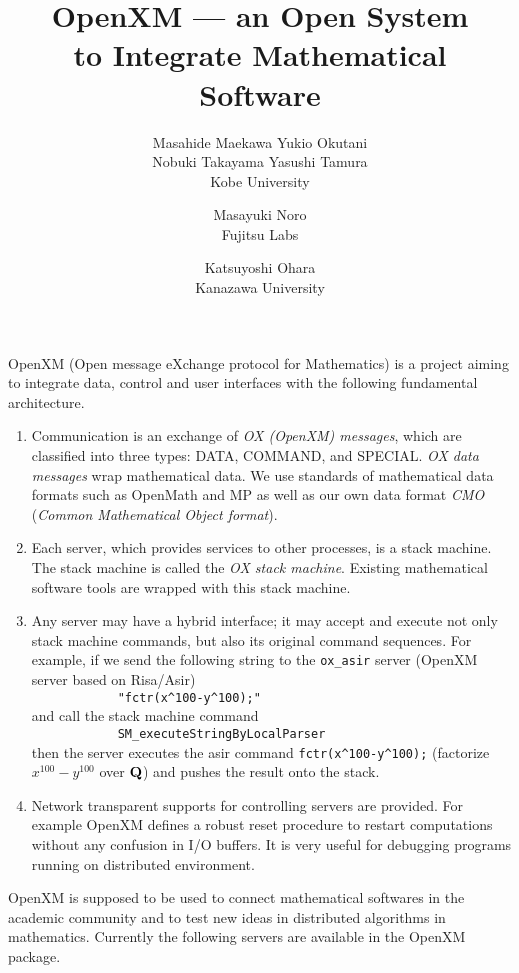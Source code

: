 \documentclass[notitlepage]{book}
\begin{document}
\date{}
\title{OpenXM 
      --- an Open System \\ to Integrate Mathematical Software}
\author{
{\hfil}
\and
{Masahide Maekawa \quad Yukio Okutani}\\
{Nobuki Takayama \quad Yasushi Tamura}\\
Kobe University
\and
{\hfil}
\and
{Masayuki Noro}\\
{Fujitsu Labs}
\and
{Katsuyoshi Ohara}\\
{Kanazawa University}
}
\maketitle

OpenXM (Open message eXchange protocol for Mathematics)
is a project aiming to integrate data, control and user interfaces
with the following fundamental architecture.
\begin{enumerate}
\item Communication is an exchange of {\it OX (OpenXM) messages},
which are classified into three types:
DATA, COMMAND, and SPECIAL.
{\it OX data messages} wrap mathematical data.
We use standards of mathematical data formats such as OpenMath and MP
as well as our own data format {\it CMO}
({\it Common Mathematical Object format}).
\item Each server, which provides services to other processes, is a stack machine. The stack machine is called the {\it OX stack machine}.
Existing mathematical software tools are wrapped with this stack machine.
\item Any server may have a hybrid interface;
it may accept and execute not only stack machine commands, 
but also its original command sequences.
For example,
if we send the following string to the {\tt ox\_asir} server 
(OpenXM server based on Risa/Asir)\\
\verb+            "fctr(x^100-y^100);"+\\
and call the stack machine command\\
\verb+            SM_executeStringByLocalParser+\\
then the server executes the asir command
\verb+fctr(x^100-y^100);+ 
(factorize $x^{100}-y^{100}$ over ${\bf Q}$)
and pushes the result onto the stack.
\item Network transparent supports for controlling servers are provided.
For example OpenXM defines a robust reset procedure to restart computations
without any confusion in I/O buffers.
It is very useful for debugging programs running on distributed environment.
\end{enumerate}
OpenXM is supposed to be used to connect mathematical
softwares in the academic community and to test new ideas in distributed
algorithms in mathematics.
Currently the following servers are available in the OpenXM package.
\end{document}
